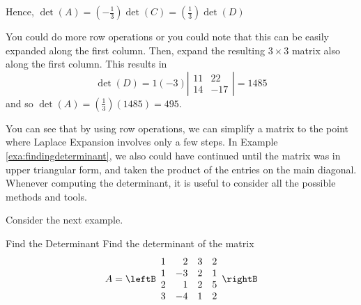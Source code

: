 \begin{solution}
Hence, $\det \left(A\right) = \left(-\frac{1}{3}\right) \det \left( C\right) = \left(\frac{1}{3}\right) \det \left( D\right)$ 

You could do more row operations or you could note that this can be easily
expanded along the first column. Then, expand the resulting $3 \times 3$ matrix
also along the first column. This results in 
\begin{equation*}
\det \left( D\right) =1\left( -3\right) \left\vert
\begin{array}{cc}
11 & 22 \\
14 & -17
\end{array}
\right\vert = 1485
\end{equation*}
and so  $\det \left( A\right) =\left(\frac{1}{3}\right) \left( 1485\right)
=495.$
\end{solution} 

You can see that by using row operations, we can simplify a matrix
to the point where Laplace Expansion involves only a few steps. In Example
\ref{exa:findingdeterminant}, we also could have continued until the matrix was in 
upper triangular form, and taken the product of the entries on the main diagonal. Whenever 
computing the determinant, it is useful to consider all the possible methods and tools.

Consider the next example.

\begin{example}{Find the Determinant}\label{exa:finddeterminant}
Find the determinant of the matrix
\begin{equation*}
A = \leftB
\begin{array}{rrrr}
1 & 2 & 3 & 2 \\
1 & -3 & 2 & 1 \\
2 & 1 & 2 & 5 \\
3 & -4 & 1 & 2
\end{array}
\rightB
\end{equation*}
\end{example}

